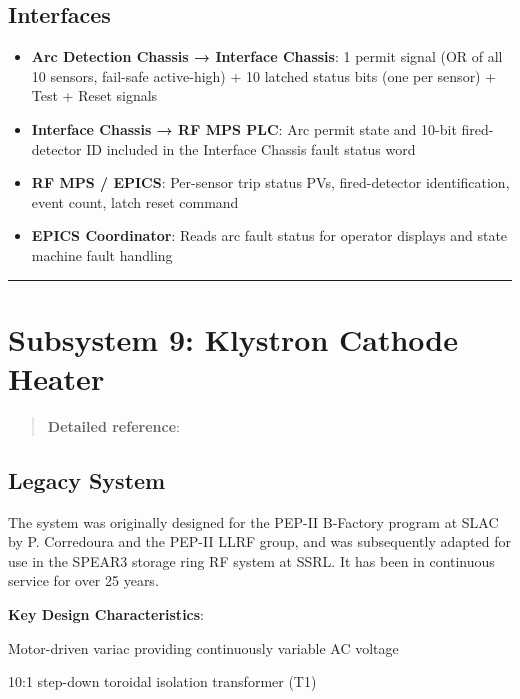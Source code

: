\subsection{Interfaces}\label{interfaces-2}

\begin{itemize}
\tightlist
\item
  \textbf{Arc Detection Chassis → Interface Chassis}: 1 permit signal (OR of all 10 sensors, fail-safe active-high) + 10 latched status bits (one per sensor) + Test + Reset signals
\item
  \textbf{Interface Chassis → RF MPS PLC}: Arc permit state and 10-bit fired-detector ID included in the Interface Chassis fault status word
\item
  \textbf{RF MPS / EPICS}: Per-sensor trip status PVs, fired-detector identification, event count, latch reset command
\item
  \textbf{EPICS Coordinator}: Reads arc fault status for operator displays and state machine fault handling
\end{itemize}

\begin{center}\rule{0.5\linewidth}{0.5pt}\end{center}

\section{Subsystem 9: Klystron Cathode Heater}\label{subsystem-9-klystron-cathode-heater}

\begin{quote}
\textbf{Detailed reference}: 
\end{quote}

\subsection{Legacy System}\label{legacy-system-2}

The system was originally designed for the PEP-II B-Factory program at SLAC by P. Corredoura and the PEP-II LLRF group, and was subsequently adapted for use in the SPEAR3 storage ring RF system at SSRL. It has been in continuous service for over 25 years.

\textbf{Key Design Characteristics}:

Motor-driven variac providing continuously variable AC voltage

10:1 step-down toroidal isolation transformer (T1)

